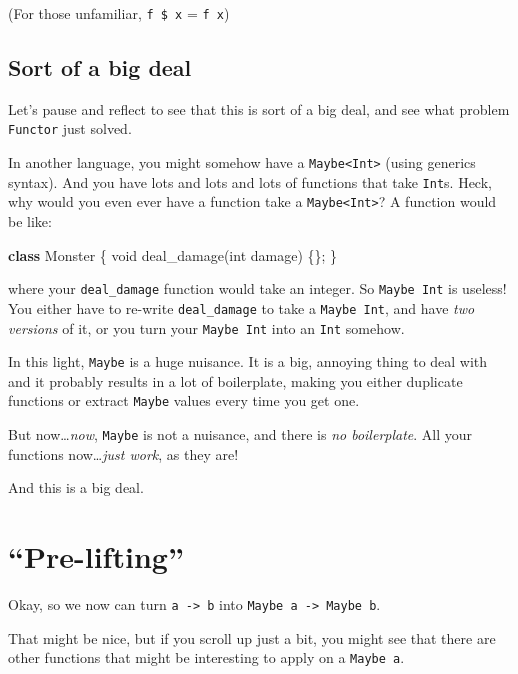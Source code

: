 \documentclass[]{article}
\newenvironment{Shaded}{}{}
\newcommand{\KeywordTok}[1]{\textcolor[rgb]{0.00,0.44,0.13}{\textbf{{#1}}}}
\newcommand{\DataTypeTok}[1]{\textcolor[rgb]{0.56,0.13,0.00}{{#1}}}
\newcommand{\FunctionTok}[1]{\textcolor[rgb]{0.02,0.16,0.49}{{#1}}}
\newcommand{\NormalTok}[1]{{#1}}
\begin{document}
(For those unfamiliar, \texttt{f\ \$\ x} = \texttt{f\ x})

\subsection{Sort of a big deal}\label{sort-of-a-big-deal}

Let's pause and reflect to see that this is sort of a big deal, and see what problem
\texttt{Functor} just solved.

In another language, you might somehow have a \texttt{Maybe\textless{}Int\textgreater{}} (using
generics syntax). And you have lots and lots and lots of functions that take \texttt{Int}s. Heck,
why would you even ever have a function take a \texttt{Maybe\textless{}Int\textgreater{}}? A
function would be like:

\begin{Shaded}
\begin{Highlighting}[]
\KeywordTok{class} \NormalTok{Monster \{}
    \DataTypeTok{void} \FunctionTok{deal_damage}\NormalTok{(}\DataTypeTok{int} \NormalTok{damage) \{\};}
\NormalTok{\}}
\end{Highlighting}
\end{Shaded}

where your \texttt{deal\_damage} function would take an integer. So \texttt{Maybe\ Int} is useless!
You either have to re-write \texttt{deal\_damage} to take a \texttt{Maybe\ Int}, and have \emph{two
versions} of it, or you turn your \texttt{Maybe\ Int} into an \texttt{Int} somehow.

In this light, \texttt{Maybe} is a huge nuisance. It is a big, annoying thing to deal with and it
probably results in a lot of boilerplate, making you either duplicate functions or extract
\texttt{Maybe} values every time you get one.

But now\ldots{}\emph{now}, \texttt{Maybe} is not a nuisance, and there is \emph{no boilerplate}. All
your functions now\ldots{}\emph{just work}, as they are!

And this is a big deal.

\section{\texorpdfstring{``Pre-lifting''}{Pre-lifting}}\label{pre-lifting}

Okay, so we now can turn \texttt{a\ -\textgreater{}\ b} into
\texttt{Maybe\ a\ -\textgreater{}\ Maybe\ b}.

That might be nice, but if you scroll up just a bit, you might see that there are other functions
that might be interesting to apply on a \texttt{Maybe\ a}.
\end{document}
